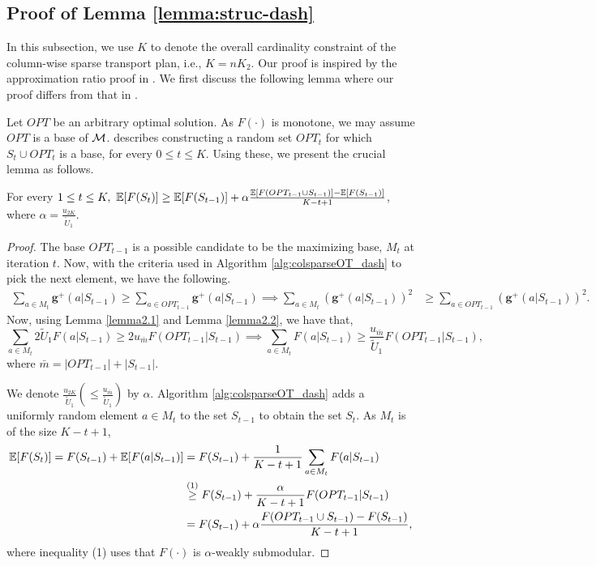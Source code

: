 \subsection[Proof of Approximation Ratio of the Proposed Algorithm for Learning Column-wise Sparse OT Plans]{Proof of Lemma \ref{lemma:struc-dash}}\label{app-lemma:struc-dash}
In this subsection, we use $K$ to denote the overall cardinality constraint of the column-wise sparse transport plan, i.e., $K=nK_2$.
Our proof is inspired by the approximation ratio proof in \citet{pmlr-v80-chen18b}.  We first discuss the following lemma where our proof differs from that in \citet{pmlr-v80-chen18b}.

Let $OPT$ be an arbitrary optimal solution. As $F(\cdot)$ is monotone, we may assume $OPT$ is a base of $\mathcal{M}$. \citet[Lemma 2.2]{pmlr-v80-chen18b} describes constructing a random set $OPT_t$ for which $S_t\cup OPT_t$ is a base, for every $0\leq t \leq K$. Using these, we present the crucial lemma as follows.
\begin{lemma}\label{matroid} For every $1\leq t \leq K, ~ \mathbb{E}[F(S_t)]\geq \mathbb{E}[F(S_{t-1})]+\alpha \frac{\mathbb{E}[F(OPT_{t-1}\cup S_{t-1})]-\mathbb{E}[F(S_{t-1})]}{K-t+1}$, where $\alpha=\frac{u_{2K}}{\tilde{U}_1}$.
\end{lemma}
\begin{proof}
The base $OPT_{t-1}$ is a possible candidate to be the maximizing base, $M_t$ at iteration $t$. Now, with the criteria used in Algorithm \ref{alg:colsparseOT_dash} to pick the next element, we have the following.
\begin{align}
\sum_{a\in M_t}\mathbf{g}^+(a|S_{t-1}) \geq \sum_{a\in OPT_{t-1}} \mathbf{g}^+(a|S_{t-1}) \implies \sum_{a\in M_t}\left(\mathbf{g}^+(a|S_{t-1})\right)^2 & \geq \sum_{a\in OPT_{t-1}} \left(\mathbf{g}^+(a|S_{t-1})\right)^2.\nonumber
\end{align}
Now, using Lemma \ref{lemma2.1} and Lemma \ref{lemma2.2}, we have that, $$\sum_{a\in M_t} 2\tilde{U}_1 F(a|S_{t-1})\geq 2u_{\bar{m}} F(OPT_{t-1}|S_{t-1})\implies \sum_{a\in M_t} F(a|S_{t-1})\geq \frac{u_{\bar{m}}}{\tilde{U}_1} F(OPT_{t-1}|S_{t-1}),$$
where $\bar{m} = |OPT_{t-1}| + |S_{t-1}|$.

We denote $\frac{u_{2K}}{\tilde{U}_1}(\leq \frac{u_{\bar{m}}}{\tilde{U}_1})$ by $\alpha$. Algorithm \ref{alg:colsparseOT_dash} adds a uniformly random element $a\in M_t$ to the set $S_{t-1}$ to obtain the set $S_t$. As $M_t$ is of the size $K-t+1$,
\begin{align*}
\mathbb{E}[F(S_t)]  = F(S_{t-1}) + \mathbb{E}[F(a|S_{t-1})]  & = F(S_{t-1}) + \frac{1}{K-t+1} \sum_{a\in M_t}F(a|S_{t-1})\\
& \stackrel{(1)}{\geq} F(S_{t-1}) + \frac{\alpha}{K-t+1}F(OPT_{t-1}|S_{t-1})\\ & = F(S_{t-1}) + \alpha\frac{F(OPT_{t-1}\cup S_{t-1})-F(S_{t-1})}{K-t+1},
\end{align*}
where inequality (1) uses that $F(\cdot)$ is $\alpha$-weakly submodular.
\end{proof}


